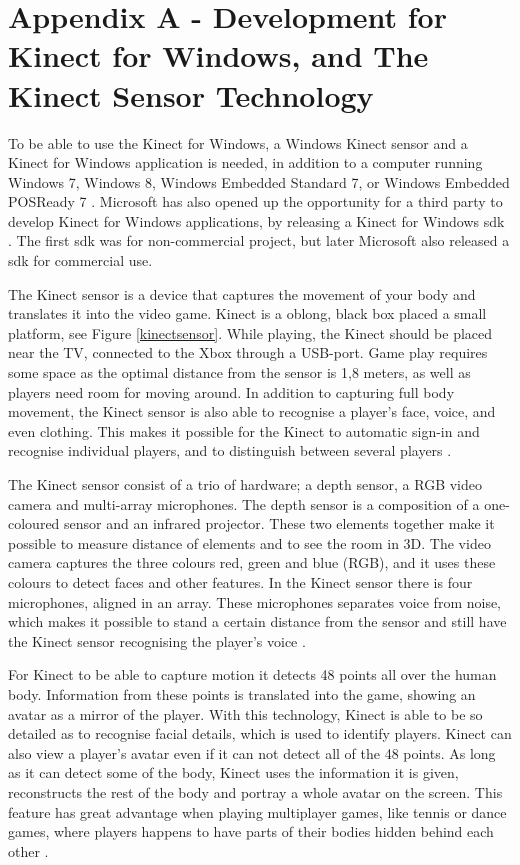 \appendix

\section*{Appendix A - Development for Kinect for Windows, and The Kinect Sensor Technology}
\label{app:kinectsensortech}

To be able to use the Kinect for Windows, a Windows Kinect sensor and a Kinect for Windows application is needed, in addition to a computer running Windows 7, Windows 8, Windows Embedded Standard 7, or Windows Embedded POSReady 7 \cite{kinectforwindows}. Microsoft has also opened up the opportunity for a third party to develop Kinect for Windows applications, by releasing a Kinect for Windows \ac{sdk} \cite{kinectforwindows}. The first \ac{sdk} was for non-commercial project, but later Microsoft also released a \ac{sdk} for commercial use. 

The Kinect sensor is a device that captures the movement of your body and translates it into the video game. Kinect is a oblong, black box placed a small platform, see Figure \ref{kinectsensor}. While playing, the Kinect should be placed near the TV, connected to the Xbox through a USB-port. Game play requires some space as the optimal distance from the sensor is 1,8 meters, as well as players need room for moving around. In addition to capturing full body movement, the Kinect sensor is also able to recognise a player's face, voice, and even clothing. This makes it possible for the Kinect to automatic sign-in and recognise individual players, and to distinguish between several players \cite{howstuffworksKinect} \cite{leyvand2011kinect}.

The Kinect sensor consist of a trio of hardware; a depth sensor, a RGB video camera and multi-array microphones. The depth sensor is a composition of a one-coloured sensor and an infrared projector. These two elements together make it possible to measure distance of elements and to see the room in 3D. The video camera captures the three colours red, green and blue (RGB), and it uses these colours to detect faces and other features. In the Kinect sensor there is four microphones, aligned in an array. These microphones separates voice from noise, which makes it possible to stand a certain distance from the sensor and still have the Kinect sensor recognising the player's voice \cite{howstuffworksKinect} \cite{leyvand2011kinect}.
 
For Kinect to be able to capture motion it detects 48 points all over the human body. Information from these points is translated into the game, showing an avatar as a mirror of the player. With this technology, Kinect is able to be so detailed as to recognise facial details, which is used to identify players. Kinect can also view a player's avatar even if it can not detect all of the 48 points. As long as it can detect some of the body, Kinect uses the information it is given, reconstructs the rest of the body and portray a whole avatar on the screen. This feature has great advantage when playing multiplayer games, like tennis or dance games, where players happens to have parts of their bodies hidden behind each other \cite{howstuffworksKinect} \cite{leyvand2011kinect}.


